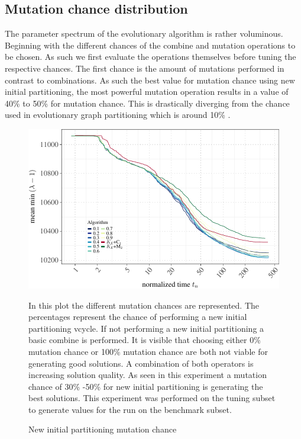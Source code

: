 \documentclass[a4paper,12pt,titlepage, BCOR7mm,headsepline]{scrbook}
\numberwithin{equation}{section}
\begin{document}
\subsection{Mutation chance distribution}
The parameter spectrum of the evolutionary algorithm is rather voluminous. Beginning with the different chances of the combine and mutation operations to be chosen. As such we first evaluate the operations themselves before tuning the respective chances. The first chance is the amount of mutations performed in contrast to combinations. As such the best value for mutation chance using new initial partitioning, the most powerful mutation operation results in a value of 40\% to 50\% for mutation chance. This is drastically diverging from the chance used in evolutionary graph partitioning which is around 10\% \cite{sanders2012distributed}. 
\begin{figure}[H]
\caption{New initial partitioning mutation chance}
\begin{center}
\includegraphics{rnw/tuning_subset_plots/mutation_tuning_plot-1}
\end{center}
In this plot the different mutation chances are represented. The percentages represent the chance of performing a new initial partitioning vcycle. If not performing a new initial partitioning a basic combine is performed. It is visible that choosing either 0\% mutation chance or 100\% mutation chance are both not viable for generating good solutions. A combination of both operators is increasing solution quality. As seen in this experiment a mutation chance of 30\% -50\% for new initial partitioning is generating the best solutions. This experiment was performed on the tuning subset to generate values for the run on the benchmark subset.
\end{figure}
\end{document}
